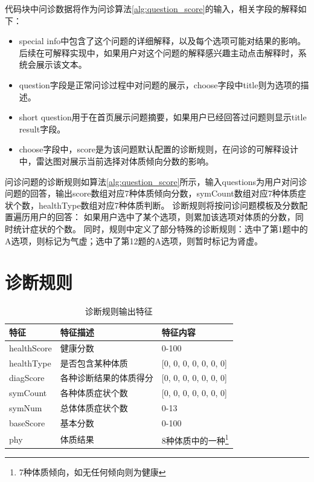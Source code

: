 代码块中问诊数据将作为问诊算法\ref{alg:question_score}的输入，相关字段的解释如下：
\begin{itemize}
    \item special info中包含了这个问题的详细解释，以及每个选项可能对结果的影响。
后续在可解释实现中，如果用户对这个问题的解释感兴趣主动点击解释时，系统会展示该文本。

    \item question字段是正常问诊过程中对问题的展示，choose字段中title则为选项的描述。

    \item short question用于在首页展示问题摘要，如果用户已经回答过问题则显示title result字段。

    \item choose字段中，score是为该问题默认配置的诊断规则，在问诊的可解释设计中，雷达图对展示当前选择对体质倾向分数的影响。
\end{itemize}

问诊问题的诊断规则如算法\ref{alg:question_score}所示，输入questions为用户对问诊问题的回答，输出score数组对应7种体质倾向分数，symCount数组对应7种体质症状个数，healthType数组对应7种体质判断。
诊断规则将按问诊问题模板及分数配置遍历用户的回答：
如果用户选中了某个选项，则累加该选项对体质的分数，同时统计症状的个数。
同时，规则中定义了部分特殊的诊断规则：选中了第1题中的A选项，则标记为气虚；选中了第12题的A选项，则暂时标记为肾虚。

\section{诊断规则}
\label{subsec:diagnose}

\begin{table}[h]
    \caption{诊断规则输出特征}
    \begin{center}
        \begin{tabular}{lll}
            \toprule
            特征 & 特征描述 & 特征内容 \\
            \midrule
            healthScore & 健康分数 & 0-100 \\
            healthType & 是否包含某种体质 & {[}0, 0, 0, 0, 0, 0, 0{]} \\
            diagScore & 各种诊断结果的体质得分 & {[}0, 0, 0, 0, 0, 0, 0{]} \\
            symCount & 各种体质症状个数 & {[}0, 0, 0, 0, 0, 0, 0{]} \\
            symNum & 总体体质症状个数 & 0-13 \\
            baseScore & 基本分数 & 0-100 \\
            phy & 体质结果 & 8种体质中的一种\footnote{7种体质倾向，如无任何倾向则为健康}\\
            \bottomrule
        \end{tabular}
    \end{center}
    \label{tab:diag-feature}
\end{table}

